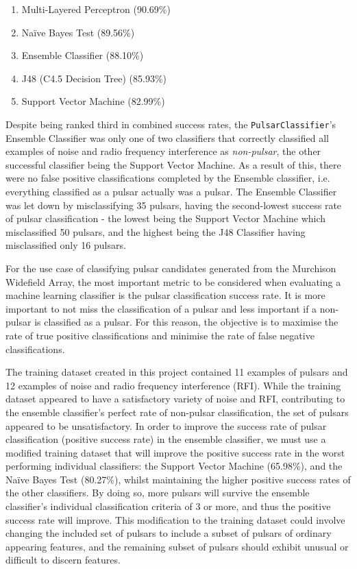 \documentclass{article}
\begin{document}
\begin{enumerate}
    \item Multi-Layered Perceptron (90.69\%)
    \item Naïve Bayes Test (89.56\%)
    \item Ensemble Classifier (88.10\%)
    \item J48 (C4.5 Decision Tree) (85.93\%)
    \item Support Vector Machine (82.99\%)
\end{enumerate}

Despite being ranked third in combined success rates, the \verb|PulsarClassifier|'s Ensemble Classifier was only one of two classifiers that correctly classified all examples of noise and radio frequency interference as \emph{non-pulsar}, the other successful classifier being the Support Vector Machine. As a result of this, there were no false positive classifications completed by the Ensemble classifier, i.e. everything classified as a pulsar actually was a pulsar. The Ensemble Classifier was let down by misclassifying 35 pulsars, having the second-lowest success rate of pulsar classification - the lowest being the Support Vector Machine which misclassified 50 pulsars, and the highest being the J48 Classifier having misclassified only 16 pulsars. 

For the use case of classifying pulsar candidates generated from the Murchison Widefield Array, the most important metric to be considered when evaluating a machine learning classifier is the pulsar classification success rate. It is more important to not miss the classification of a pulsar and less important if a non-pulsar is classified as a pulsar. For this reason, the objective is to maximise the rate of true positive classifications and minimise the rate of false negative classifications.

The training dataset created in this project contained 11 examples of pulsars and 12 examples of noise and radio frequency interference (RFI). While the training dataset appeared to have a satisfactory variety of noise and RFI, contributing to the ensemble classifier's perfect rate of non-pulsar classification, the set of pulsars appeared to be unsatisfactory. In order to improve the success rate of pulsar classification (positive success rate) in the ensemble classifier, we must use a modified training dataset that will improve the positive success rate in the worst performing individual classifiers: the Support Vector Machine (65.98\%), and the Naïve Bayes Test (80.27\%), whilst maintaining the higher positive success rates of the other classifiers. By doing so, more pulsars will survive the ensemble classifier's individual classification criteria of 3 or more, and thus the positive success rate will improve. This modification to the training dataset could involve changing the included set of pulsars to include a subset of pulsars of ordinary appearing features, and the remaining subset of pulsars should exhibit unusual or difficult to discern features.
\end{document}
